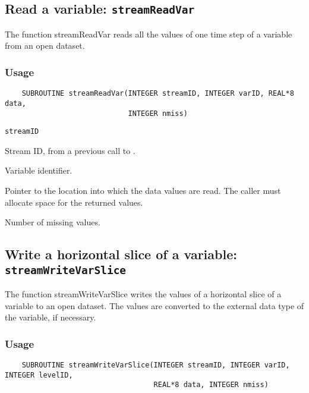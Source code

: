 \subsection{Read a variable: {\tt streamReadVar}}
\label{streamReadVar}

The function streamReadVar reads all the values of one time step of a variable
from an open dataset.
\subsubsection*{Usage}

\begin{verbatim}
    SUBROUTINE streamReadVar(INTEGER streamID, INTEGER varID, REAL*8 data, 
                             INTEGER nmiss)
\end{verbatim}

\hspace*{4mm}\begin{minipage}[]{15cm}
\begin{deflist}{\tt streamID\ }
\item[{\tt streamID}]
Stream ID, from a previous call to {}.
\item[{\tt varID}]
Variable identifier.
\item[{\tt data}]
Pointer to the location into which the data values are read.
                     The caller must allocate space for the returned values.
\item[{\tt nmiss}]
Number of missing values.

\end{deflist}
\end{minipage}


\subsection{Write a horizontal slice of a variable: {\tt streamWriteVarSlice}}
\label{streamWriteVarSlice}

The function streamWriteVarSlice writes the values of a horizontal slice of a variable to an open dataset.
The values are converted to the external data type of the variable, if necessary.
\subsubsection*{Usage}

\begin{verbatim}
    SUBROUTINE streamWriteVarSlice(INTEGER streamID, INTEGER varID, INTEGER levelID, 
                                   REAL*8 data, INTEGER nmiss)
\end{verbatim}

